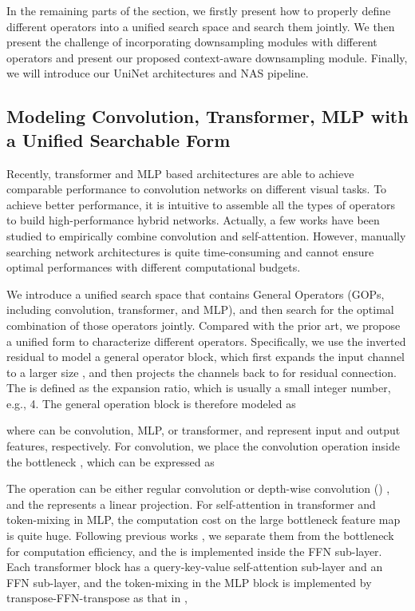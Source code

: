 \documentclass[runningheads]{llncs}
\begin{document}
In the remaining parts of the section, we firstly present how to properly define different operators into a unified search space and search them jointly. We then present the challenge of incorporating downsampling modules with different operators and present our proposed context-aware downsampling module. Finally, we will introduce our UniNet architectures and NAS pipeline.


\subsection{Modeling Convolution, Transformer, MLP with a Unified Searchable Form}
\label{sec3.2}

Recently, transformer and MLP based architectures are able to achieve comparable performance to convolution networks on different visual tasks. To achieve better performance, it is intuitive to assemble all the types of operators to build high-performance hybrid networks.
Actually, a few works \cite{cvt,yuan2021incorporating,convit} have been studied to empirically combine convolution and self-attention. However, manually searching network architectures is quite time-consuming and cannot ensure optimal performances with different computational budgets.

We introduce a unified search space that contains General Operators (GOPs, including convolution, transformer, and MLP), and then search for the optimal combination of those operators jointly. Compared with the prior art, we propose a unified form to characterize different operators. Specifically, we use the inverted residual \cite{mbv2} to model a general operator block, which first expands the input channel  to a larger size , and then projects the  channels back to  for residual connection. The  is defined as the expansion ratio, which is usually a small integer number, e.g., 4. The general operation block is therefore modeled as

where  can be convolution, MLP, or transformer, and  represent input and output features, respectively. For convolution, we place the convolution operation inside the bottleneck \cite{mbv2}, which can be expressed as

The  operation can be either regular convolution or depth-wise convolution () \cite{xception}, and the  represents a linear projection.
For self-attention in transformer and token-mixing in MLP, the computation cost on the large bottleneck feature map is quite huge. Following previous works \cite{vit,mixer}, we separate them from the bottleneck for computation efficiency, and the  is implemented inside the FFN \cite{attention} sub-layer. Each transformer block has a query-key-value self-attention sub-layer and an FFN sub-layer, and the token-mixing in the MLP block is implemented by transpose-FFN-transpose 
as that in \cite{mixer},
\end{document}
